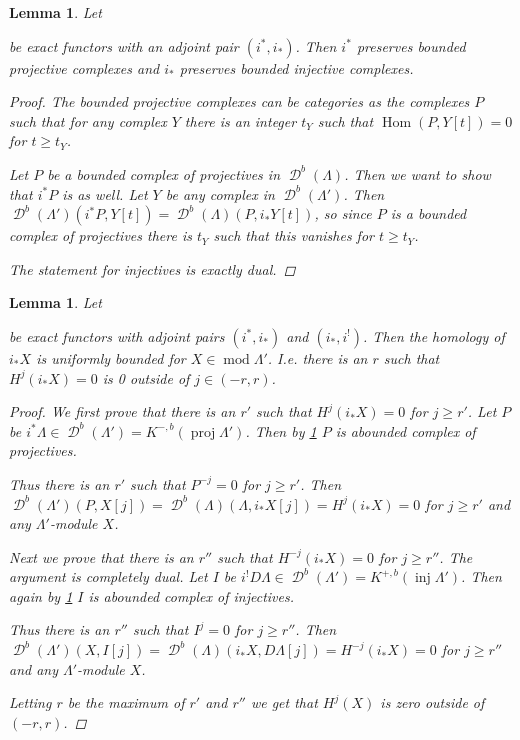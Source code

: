\documentclass[11pt, a4paper, english]{article}
\newtheorem{lemma}[theorem]{Lemma}
\theoremstyle{definition}
\DeclareMathOperator{\Hom}{Hom}
\DeclareMathOperator{\inj}{inj}
\DeclareMathOperator{\proj}{proj}
\def\mod{\operatorname{mod}}
\DeclareMathOperator{\D}{\mathcal{D}}
\begin{document}
\begin{lemma} \label{lem:adjoint_preserves_bounded_proj/inj}
	Let  be exact functors with an adjoint pair $(i^*,i_*)$. Then $i^*$ preserves bounded projective complexes and $i_*$ preserves bounded injective complexes.
	\begin{proof}
		The bounded projective complexes can be categories as the complexes $P$ such that for any complex $Y$ there is an integer $t_Y$ such that $\Hom(P, Y[t])=0$ for $t\geq t_Y$.
		
		Let $P$ be a bounded complex of projectives in $\D^b(\Lambda)$. Then we want to show that $i^*P$ is as well. Let $Y$ be any complex in $\D^b(\Lambda')$. Then $\D^b(\Lambda')(i^*P, Y[t]) = \D^b(\Lambda)(P, i_*Y[t])$, so since $P$ is a bounded complex of projectives there is $t_Y$ such that this vanishes for $t \geq t_Y$.
		
		The statement for injectives is exactly dual. 
	\end{proof}
\end{lemma}

\begin{lemma} \label{lem:uniform_bound_on_homology}
	Let  be exact functors with adjoint pairs $(i^*,i_*)$ and $(i_*, i^!)$. Then the homology of $i_*X$ is uniformly bounded for $X\in\mod\Lambda'$. I.e. there is an $r$ such that $H^{j}(i_*X) = 0$ is 0 outside of $j\in(-r, r)$.
	\begin{proof}
		We first prove that there is an $r'$ such that $H^{j}(i_*X)=0$ for $j \geq r'$.
		Let $P$ be $i^*\Lambda \in \D^b(\Lambda')=K^{-,b}(\proj\Lambda')$. Then by \cref{lem:adjoint_preserves_bounded_proj/inj} $P$ is abounded complex of projectives.
		
		Thus there is an $r'$ such that $P^{-j}=0$ for $j \geq r'$. Then $\D^b(\Lambda')(P, X[j]) = \D^b(\Lambda)(\Lambda, i_*X[j]) = H^{j}(i_*X)=0$ for $j\geq r'$ and any $\Lambda'$-module $X$.
		
		Next we prove that there is an $r''$ such that $H^{-j}(i_*X)=0$ for $j \geq r''$. The argument is completely dual. Let $I$ be $i^!D\Lambda \in \D^b(\Lambda')=K^{+,b}(\inj\Lambda')$. Then again by \cref{lem:adjoint_preserves_bounded_proj/inj} $I$ is abounded complex of injectives.
		
		Thus there is an $r''$ such that $I^{j}=0$ for $j \geq r''$. Then $\D^b(\Lambda')(X, I[j]) = \D^b(\Lambda)(i_*X, D\Lambda[j]) = H^{-j}(i_*X)=0$ for $j\geq r''$ and any $\Lambda'$-module $X$.
		
		Letting $r$ be the maximum of $r'$ and $r''$ we get that $H^{j}(X)$ is zero outside of $(-r, r)$.
	\end{proof}
\end{lemma}
\end{document}

